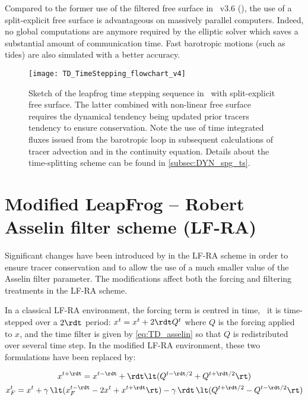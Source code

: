 \documentclass[../main/NEMO_manual]{subfiles}
\begin{document}
Compared to the former use of the filtered free surface in \NEMO\ v3.6 (\citet{roullet.madec_JGR00}),
the use of a split-explicit free surface is advantageous on massively parallel computers.
Indeed, no global computations are anymore required by the elliptic solver which
saves a substantial amount of communication time.
Fast barotropic motions (such as tides) are also simulated with a better accuracy.

\begin{figure}
  \centering
  \texttt{[image: TD\_TimeStepping\_flowchart\_v4]}
  \caption[Leapfrog time stepping sequence with split-explicit free surface]{
    Sketch of the leapfrog time stepping sequence in \NEMO\ with split-explicit free surface.
    The latter combined with non-linear free surface requires
    the dynamical tendency being updated prior tracers tendency to ensure conservation.
    Note the use of time integrated fluxes issued from the barotropic loop in
    subsequent calculations of tracer advection and in the continuity equation.
    Details about the time-splitting scheme can be found in \autoref{subsec:DYN_spg_ts}.}
  \label{fig:TD_TimeStep_flowchart}
\end{figure}

\section{Modified LeapFrog -- Robert Asselin filter scheme (LF-RA)}
\label{sec:TD_mLF}

Significant changes have been introduced by \cite{leclair.madec_OM09} in
the LF-RA scheme in order to ensure tracer conservation and to
allow the use of a much smaller value of the Asselin filter parameter.
The modifications affect both the forcing and filtering treatments in the LF-RA scheme.

In a classical LF-RA environment,
the forcing term is centred in time, \ie\ it is time-stepped over a $2 \rdt$ period:
$x^t = x^t + 2 \rdt Q^t$ where $Q$ is the forcing applied to $x$,
and the time filter is given by \autoref{eq:TD_asselin} so that
$Q$ is redistributed over several time step.
In the modified LF-RA environment, these two formulations have been replaced by:

\begin{gather}
  \label{eq:TD_forcing}
  x^{t + \rdt} = x^{t - \rdt} + \rdt \lt( Q^{t - \rdt / 2} + Q^{t + \rdt / 2} \rt)  \\
  \label{eq:TD_RA}
  x_F^t       = x^t + \gamma \, \lt( x_F^{t - \rdt} - 2 x^t + x^{t + \rdt} \rt)
                    - \gamma \, \rdt \, \lt( Q^{t + \rdt / 2} - Q^{t - \rdt / 2} \rt)
\end{gather}
\end{document}
